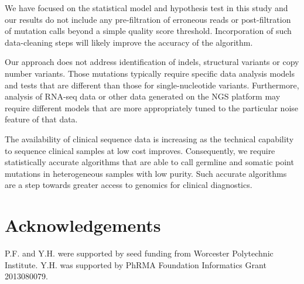 \documentclass{bioinfo}
\begin{document}
We have focused on the statistical model and hypothesis test in this study and our results do not include any pre-filtration of erroneous reads or post-filtration of mutation calls beyond a simple quality score threshold. Incorporation of such data-cleaning steps will likely improve the accuracy of the algorithm.

Our approach does not address identification of indels, structural variants or copy number variants. Those mutations typically require specific data analysis models and tests that are different than those for single-nucleotide variants. Furthermore, analysis of RNA-seq data or other data generated on the NGS platform may require different models that are more appropriately tuned to the particular noise feature of that data.

The availability of clinical sequence data is increasing as the technical capability to sequence clinical samples at low cost improves. Consequently, we require statistically accurate algorithms that are able to call germline and somatic point mutations in heterogeneous samples with low purity. Such accurate algorithms are a step towards greater access to genomics for clinical diagnostics.

\vspace{-5pt}
\section*{Acknowledgements}
P.F. and Y.H. were supported by seed funding from Worcester Polytechnic Institute. Y.H. was supported by PhRMA Foundation Informatics Grant 2013080079.



\end{document}
